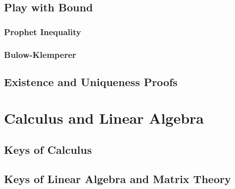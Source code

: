 \documentclass[10pt]{report}
\begin{document}
\subsection{Play with Bound}

\subsubsection{Prophet Inequality}

\subsubsection{Bulow-Klemperer}

\subsection{Existence and Uniqueness Proofs}

\section{Calculus and Linear Algebra}

\subsection{Keys of Calculus}

\subsection{Keys of Linear Algebra and Matrix Theory}
\end{document}
